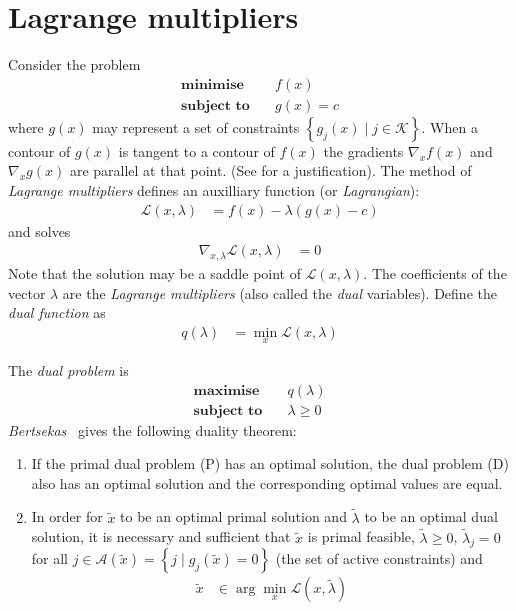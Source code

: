 \documentclass[a4paper,twoside,10pt,english]{report}
\begin{document}
\section{Lagrange multipliers}
Consider the problem 
\begin{align*}
\textbf{minimise}   \quad & f\left(x\right)\\
\textbf{subject to} \quad & g\left(x\right) = c
\end{align*}
where $g\left(x\right)$ may represent a set of constraints 
$\left\{ g_{j}\left(x\right) \mid j \in \mathcal{K}\right\}$. When a contour 
of $g\left(x\right)$ is tangent to a contour of $f\left(x\right)$
the gradients $\nabla_{x}f\left(x\right)$ and $\nabla_{x}g\left(x\right)$
are parallel at that point. (See 
\cite[p. 309]{NocedalWright_NumericalOptimization} for a justification). The
method of \emph{Lagrange multipliers} defines an auxilliary function (or 
\emph{Lagrangian}):
\begin{align*}
\mathcal{L}\left(x,\lambda\right) &= f\left(x\right)-\lambda\left(g\left(x\right)-c\right)
\end{align*}
and solves
\begin{align*}
\nabla_{x,\lambda}\mathcal{L}\left(x,\lambda\right) &= 0
\end{align*}
Note that the solution may be a saddle point of 
$\mathcal{L}\left(x,\lambda\right)$. The coefficients of the vector 
$\lambda$ are the \emph{Lagrange multipliers} (also called the \emph{dual} 
variables). Define the \emph{dual function} as 
\begin{align*}
q\left(\lambda\right) &= \min_{x}\mathcal{L}\left(x,\lambda\right)
\end{align*}

The \emph{dual problem }is
\begin{align*}
\textbf{maximise}   \quad & q\left(\lambda\right)\\
\textbf{subject to} \quad & \lambda\ge0
\end{align*}
\emph{Bertsekas}~\cite[Proposition 3.4.2]{Bertsekas_NonlinearProgramming}
gives the following duality theorem:
\begin{enumerate}
\item If the primal dual problem (P) has an optimal solution, the dual problem
(D) also has an optimal solution and the corresponding optimal values
are equal.
\item In order for $\tilde{x}$ to be an optimal primal solution and $\tilde{\lambda}$
to be an optimal dual solution, it is necessary and sufficient that
$\tilde{x}$ is primal feasible, $\tilde{\lambda}\ge0$, $\tilde{\lambda}_{j}=0$
for all $j \in \mathcal{A}\left(\tilde{x}\right)=\left\{ j\mid g_{j}\left(\tilde{x}\right)=0\right\} $
(the set of active constraints) and
\begin{align*}
\tilde{x} & \in \arg\min_{x}\mathcal{L}\left(x,\tilde{\lambda}\right)
\end{align*}

\end{enumerate}
\end{document}
